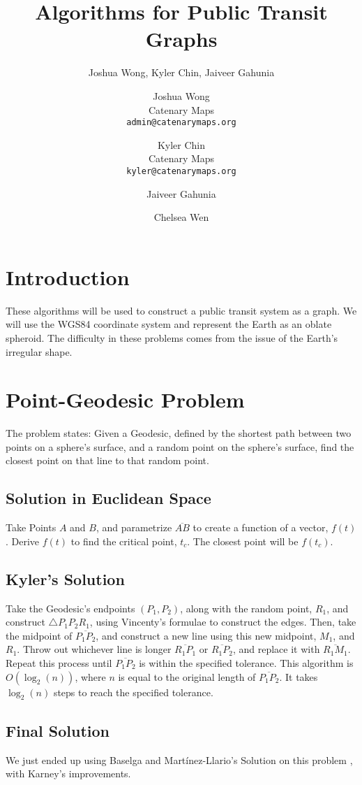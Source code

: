 \documentclass[a4paper,10pt]{article}
\title{Algorithms for Public Transit Graphs}
\author{Joshua Wong, Kyler Chin, Jaiveer Gahunia}
\author{
  \small Joshua Wong \\
  \small Catenary Maps \\
  \small \texttt{admin@catenarymaps.org}
  \and
  \small Kyler Chin \\
  \small Catenary Maps \\
  \small \texttt{kyler@catenarymaps.org}
  \and Jaiveer Gahunia
  \and Chelsea Wen
}
\begin{document}
\maketitle

\begin{abstract}

\end{abstract}

\section{Introduction}
These algorithms will be used to construct a public transit system as a graph.
We will use the WGS84 coordinate system and represent the Earth as an oblate spheroid. The difficulty in these problems comes from the issue of the Earth's irregular shape.
\section{Point-Geodesic Problem}
The problem states: Given a Geodesic, defined by the shortest path between two points on a sphere's surface, and a random point on the sphere's surface, find the closest point on that line to that random point.
\subsection{Solution in Euclidean Space}
Take Points $A$ and $B$, and parametrize $\overline{AB}$ to create a function of a vector, $f(t)$. Derive $f(t)$ to find the critical point, $t_c$. The closest point will be $f(t_c)$.
\subsection{Kyler's Solution}
Take the Geodesic's endpoints $(P_1, P_2)$, along with the random point, $R_1$, and construct $\triangle{P_1P_2R_1}$, using Vincenty's formulae to construct the edges. Then, take the midpoint of $\overline{P_1P_2}$, and construct a new line using this new midpoint, $M_1$, and $R_1$. Throw out whichever line is longer $\overline{R_1P_1}$ or $\overline{R_1P_2}$, and replace it with $\overline{R_1M_1}$. Repeat this process until $\overline{P_1P_2}$ is within the specified tolerance. This algorithm is $O(\log_2(n))$, where $n$ is equal to the original length of $\overline{P_1P_2}$. It takes $\log_2(n)$ steps to reach the specified tolerance.
\subsection{Final Solution}
We just ended up using Baselga and Martínez-Llario's Solution on this problem \cite{Baselga2018}, with Karney's improvements. \cite{karney2023geodesic}


\end{document}
